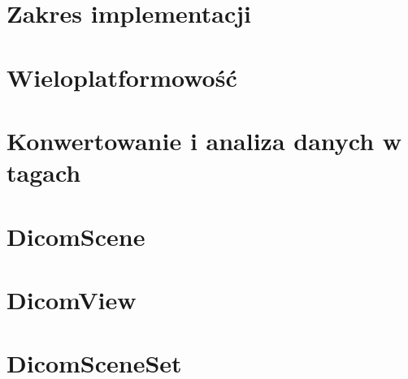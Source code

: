 

\section*{Zakres implementacji}


\section*{Wieloplatformowość}


\section*{Konwertowanie i analiza danych w tagach}


\section*{DicomScene}


\section*{DicomView}


\section*{DicomSceneSet}


